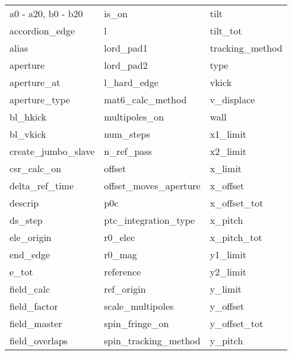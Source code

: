  \begin{tabular}{lll} \toprule
a0 - a20, b0 - b20          & is_on                       & tilt                        \\
accordion_edge              & l                           & tilt_tot                    \\
alias                       & lord_pad1                   & tracking_method             \\
aperture                    & lord_pad2                   & type                        \\
aperture_at                 & l_hard_edge                 & vkick                       \\
aperture_type               & mat6_calc_method            & v_displace                  \\
bl_hkick                    & multipoles_on               & wall                        \\
bl_vkick                    & num_steps                   & x1_limit                    \\
create_jumbo_slave          & n_ref_pass                  & x2_limit                    \\
csr_calc_on                 & offset                      & x_limit                     \\
delta_ref_time              & offset_moves_aperture       & x_offset                    \\
descrip                     & p0c                         & x_offset_tot                \\
ds_step                     & ptc_integration_type        & x_pitch                     \\
ele_origin                  & r0_elec                     & x_pitch_tot                 \\
end_edge                    & r0_mag                      & y1_limit                    \\
e_tot                       & reference                   & y2_limit                    \\
field_calc                  & ref_origin                  & y_limit                     \\
field_factor                & scale_multipoles            & y_offset                    \\
field_master                & spin_fringe_on              & y_offset_tot                \\
field_overlaps              & spin_tracking_method        & y_pitch                     \\

\end{tabular}
